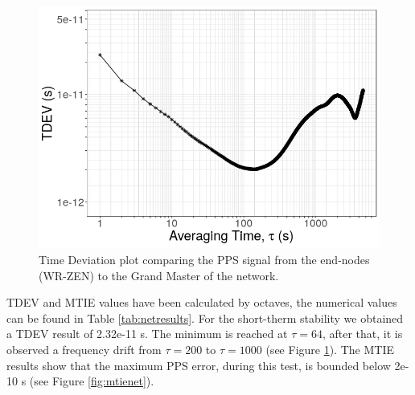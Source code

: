 \begin{figure}
	\centering
	\includegraphics[width=0.7\linewidth]{img/tdev_exp3}
	\caption[TDEV of the end-nodes in the scalability test.]{Time Deviation 
	plot comparing the PPS signal from the end-nodes (WR-ZEN) to the Grand 
	Master of the network.}
	\label{fig:tdevnet}
\end{figure}

TDEV and MTIE values have been calculated by octaves, the numerical 
values can be found in Table \ref{tab:netresults}. For the short-therm 
stability we obtained a TDEV result of 2.32e-11 s. The minimum is reached at 
$\tau=64$, after that, it is observed a frequency drift from $\tau=200$ to 
$\tau=1000$ (see Figure \ref{fig:tdevnet}). The MTIE results show that the maximum 
PPS error, during this test, is bounded below 2e-10 s (see Figure 
\ref{fig:mtienet}).

